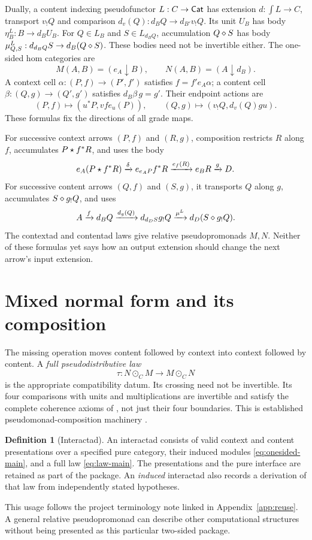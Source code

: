 \documentclass[11pt]{article}
\numberwithin{equation}{section}
\theoremstyle{definition}\newtheorem{definition}[theorem]{Definition}
\begin{document}
Dually, a content indexing pseudofunctor $L:C\to\mathsf{Cat}$ has extension
$d:\int L\to C$, transport $v_!Q$ and comparison
$d_v(Q):d_BQ\to d_{B'}v_!Q$. Its unit $U_B$ has body
$\eta^L_B:B\to d_BU_B$. For $Q\in L_B$ and $S\in L_{d_BQ}$,
accumulation $Q\mathbin{\diamond} S$ has body
$\mu^L_{Q,S}:d_{d_BQ}S\to d_B(Q\mathbin{\diamond} S)$. These bodies need not be
invertible either. The one-sided hom categories are
\begin{equation}\label{eq:onesided-main}
 M(A,B)=(e_A\downarrow B),\qquad N(A,B)=(A\downarrow d_B).
\end{equation}
A context cell $\alpha:(P,f)\to(P',f')$ satisfies $f=f'e_A\alpha$;
a content cell $\beta:(Q,g)\to(Q',g')$ satisfies $d_B\beta\,g=g'$.
Their endpoint actions are
\[
 (P,f)\mapsto(u^*P,vf e_u(P)),\qquad
 (Q,g)\mapsto(v_!Q,d_v(Q)gu).
\]
These formulas fix the directions of all grade maps.

For successive context arrows $(P,f)$ and $(R,g)$, composition restricts
$R$ along $f$, accumulates $P\mathbin{\star} f^*R$, and uses the body
\[
 e_A(P\mathbin{\star} f^*R)\xrightarrow{\delta}e_{e_AP}f^*R
                  \xrightarrow{e_f(R)}e_BR\xrightarrow g D.
\]
For successive content arrows $(Q,f)$ and $(S,g)$, it transports $Q$
along $g$, accumulates $S\mathbin{\diamond} g_!Q$, and uses
\[
 A\xrightarrow f d_BQ\xrightarrow{d_g(Q)}d_{d_DS}g_!Q
                  \xrightarrow{\mu^L}d_D(S\mathbin{\diamond} g_!Q).
\]
The contextad and contentad laws give relative pseudopromonads $M,N$.
Neither of these formulas yet says how an output extension should change
the next arrow's input extension.

\section{Mixed normal form and its composition}\label{sec:mixed-main}
The missing operation moves content followed by context into context
followed by content. A \emph{full pseudodistributive law}
\begin{equation}\label{eq:law-main}
                 \tau:N\odot_CM\longrightarrow M\odot_CN
\end{equation}
is the appropriate compatibility datum. Its crossing need not be
invertible. Its four comparisons with units and multiplications are
invertible and satisfy the complete coherence axioms of
\cite[Def.~4.1]{GL}, not just their four boundaries. This is established
pseudomonad-composition machinery \cite{marmolejo,street}.

\begin{definition}[Interactad]\label{def:interactad}
An interactad consists of valid context and content presentations over a
specified pure category, their induced modules \eqref{eq:onesided-main},
and a full law \eqref{eq:law-main}. The presentations and the pure
interface are retained as part of the package. An \emph{induced} interactad
also records a derivation of that law from independently stated hypotheses.
\end{definition}
This usage follows the project terminology note linked in Appendix~\ref{app:reuse}. A general
relative pseudopromonad can describe other computational structures without
being presented as this particular two-sided package.
\end{document}
